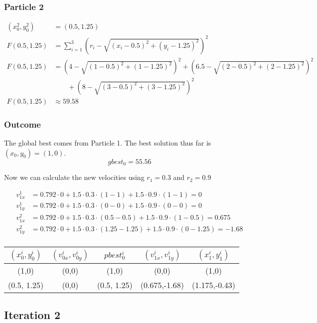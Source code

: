 \documentclass[a4paper]{article}
\begin{document}
\subsubsection{Particle 2}
\begin{align*}
(x_0^2,y_0^2) &= (0.5,1.25)\\
F(0.5,1.25) &= \sum_{i=1}^3(r_i - \sqrt{(x_i-0.5)^2 + (y_i-1.25)^2})^2\\
F(0.5,1.25) &= (4 - \sqrt{ (1-0.5)^2 + (1-1.25)^2 })^2 + (6.5 - \sqrt{ (2-0.5)^2 + (2-1.25)^2 })^2 \\
            &\qquad + (8 - \sqrt{ (3-0.5)^2 + (3-1.25)^2 })^2\\
F(0.5,1.25) &\approx 59.58
\end{align*}

\subsubsection{Outcome}
The global best comes from Particle 1. The best solution thus far is $(x_0, y_0) = (1,0)$.
\[
	gbest_0 = 55.56
\]

Now we can calculate the new velocities using $r_1=0.3$ and $r_2=0.9$

\begin{align*}
v_{1x}^1 &= 0.792\cdot0 + 1.5\cdot0.3\cdot(1-1) + 1.5\cdot0.9\cdot(1-1) = 0\\
v_{1y}^1 &= 0.792\cdot0 + 1.5\cdot0.3\cdot(0-0) + 1.5\cdot0.9\cdot(0-0) = 0\\
v_{1x}^2 &= 0.792\cdot0 + 1.5\cdot0.3\cdot(0.5-0.5) + 1.5\cdot0.9\cdot(1-0.5) = 0.675\\
v_{1y}^2 &= 0.792\cdot0 + 1.5\cdot0.3\cdot(1.25-1.25) + 1.5\cdot0.9\cdot(0-1.25) = -1.68\\
\end{align*}

\begin{table}
    \begin{tabular}{|c|c|c|c|c|}
    $(x_0^i,y_0^i)$ & $(v_{0x}^i,v_{0y}^i)$ & $pbest_0^i$ & $(v_{1x}^i,v_{1y}^i)$ & $(x_1^i,y_1^i)$ \\ \hline
    (1,0) & (0,0) & (1,0) & (0,0) & (1,0) \\ \hline
    (0.5, 1.25) & (0,0) & (0.5, 1.25) & (0.675,-1.68) & (1.175,-0.43) \\ \hline
    \end{tabular}
\end{table}

\subsection{Iteration 2}
\end{document}
